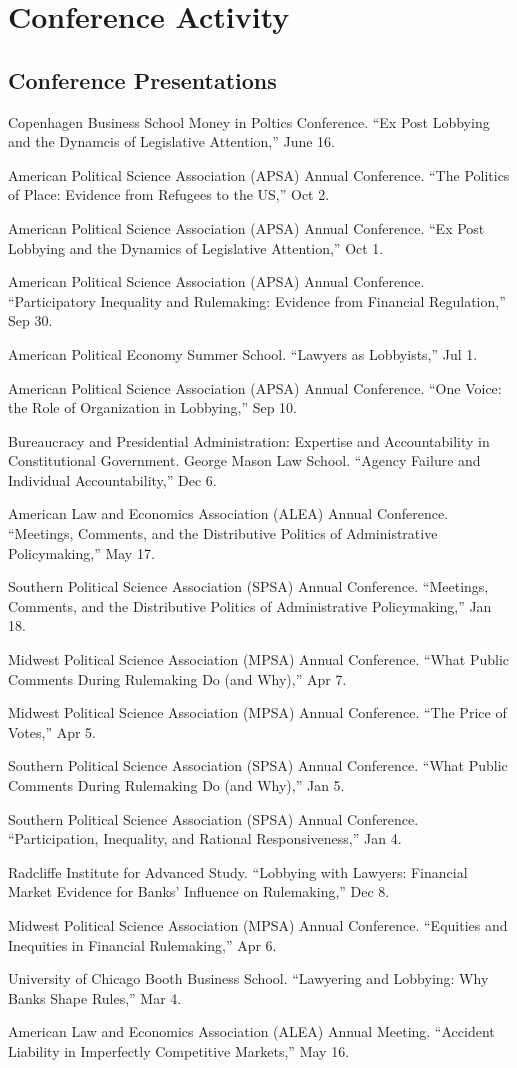 \documentclass[12pt,letterpaper]{report}
\newcommand{\talk}[4]{\item[#1]{\tab{}#3. \enquote{#2,} #4.}} %
\newcommand{\APSA}{American Political Science Association (APSA) Annual Conference}
\begin{document}
    \section*{Conference Activity}
    
    \subsection*{Conference Presentations}
    \begin{tablist}
    \talk{2022}{Ex Post Lobbying and the Dynamcis of Legislative Attention}{Copenhagen Business School Money in Poltics Conference}{June 16}
    \talk{2021}{The Politics of Place: Evidence from Refugees to the US}{\APSA}{Oct 2}
    \talk{2021}{Ex Post Lobbying and the Dynamics of Legislative Attention}{\APSA}{Oct 1}
    \talk{2021}{Participatory Inequality and Rulemaking: Evidence from Financial Regulation}{\APSA}{Sep 30}
    \talk{2021}{Lawyers as Lobbyists}{American Political Economy Summer School}{Jul 1}
    \talk{2020}{One Voice: the Role of Organization in Lobbying}{\APSA}{Sep 10}
    \talk{2019}{Agency Failure and Individual Accountability}{Bureaucracy and Presidential Administration: Expertise and Accountability in Constitutional Government. George Mason Law School}{Dec 6}
    \talk{2019}{Meetings, Comments, and the Distributive Politics of Administrative Policymaking}{American Law and Economics Association (ALEA) Annual Conference}{May 17}
    \talk{2019}{Meetings, Comments, and the Distributive Politics of Administrative Policymaking}{Southern Political Science Association (SPSA) Annual Conference}{Jan 18} 
    \talk{2018}{What Public Comments During Rulemaking Do (and Why)}{Midwest Political Science Association (MPSA) Annual Conference}{Apr 7}
    \talk{2018}{The Price of Votes}{Midwest Political Science Association (MPSA) Annual Conference}{Apr 5}
    \talk{2018}{What Public Comments During Rulemaking Do (and Why)}{Southern Political Science Association (SPSA) Annual Conference}{Jan 5} 
    \talk{2018}{Participation, Inequality, and Rational Responsiveness}{Southern Political Science Association (SPSA) Annual Conference}{Jan 4}    
    \talk{2017}{Lobbying with Lawyers: Financial Market Evidence for Banks’ Influence on Rulemaking}{Radcliffe Institute for Advanced Study}{Dec 8}
    \talk{2017}{Equities and Inequities in Financial Rulemaking}{Midwest Political Science Association (MPSA) Annual Conference}{Apr 6}
	\talk{2017}{Lawyering and Lobbying: Why Banks Shape Rules}{University of Chicago Booth Business School}{Mar 4}
	\talk{2015}{Accident Liability in Imperfectly Competitive Markets}{American Law and Economics Association (ALEA) Annual Meeting}{May 16}
    \end{tablist}
    
\end{document}

